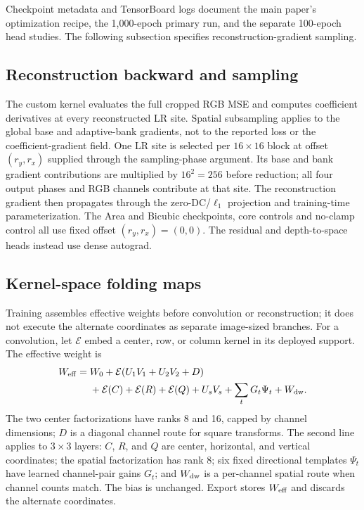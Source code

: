 \documentclass[10pt,twocolumn,letterpaper]{article}
\begin{document}
Checkpoint metadata and TensorBoard logs document the main paper's optimization recipe, the 1,000-epoch primary run, and the separate 100-epoch head studies.
The following subsection specifies reconstruction-gradient sampling.

\subsection{Reconstruction backward and sampling}
The custom kernel evaluates the full cropped RGB MSE and computes coefficient derivatives at every reconstructed LR site.
Spatial subsampling applies to the global base and adaptive-bank gradients, not to the reported loss or the coefficient-gradient field.
One LR site is selected per $16\times16$ block at offset $(r_y,r_x)$ supplied through the sampling-phase argument.
Its base and bank gradient contributions are multiplied by $16^2=256$ before reduction; all four output phases and RGB channels contribute at that site.
The reconstruction gradient then propagates through the zero-DC/$\ell_1$ projection and training-time parameterization.
The Area and Bicubic checkpoints, core controls and no-clamp control all use fixed offset $(r_y,r_x)=(0,0)$.
The residual and depth-to-space heads instead use dense autograd.

\subsection{Kernel-space folding maps}
Training assembles effective weights before convolution or reconstruction; it does not execute the alternate coordinates as separate image-sized branches.
For a convolution, let $\mathcal E$ embed a center, row, or column kernel in its deployed support.
The effective weight is
\begin{align}
 W_{\rm eff}={}&W_0+\mathcal E(U_1V_1+U_2V_2+D)\\
 &+\mathcal E(C)+\mathcal E(R)+\mathcal E(Q)
   +U_sV_s+\sum_t G_t\Psi_t+W_{\rm dw}.
\end{align}
The two center factorizations have ranks 8 and 16, capped by channel dimensions; $D$ is a diagonal channel route for square transforms.
The second line applies to $3\times3$ layers: $C$, $R$, and $Q$ are center, horizontal, and vertical coordinates; the spatial factorization has rank 8; six fixed directional templates $\Psi_t$ have learned channel-pair gains $G_t$; and $W_{\rm dw}$ is a per-channel spatial route when channel counts match.
The bias is unchanged.
Export stores $W_{\rm eff}$ and discards the alternate coordinates.
\end{document}
